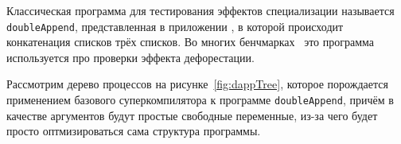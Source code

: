 

Классическая программа для тестирования эффектов специализации называется
\lstinline{doubleAppend}, представленная в приложении \todo{},
в которой происходит конкатенация списков трёх списков.
Во многих бенчмарках~\cite{cpdPract, controlPoly} это программа используется
про проверки эффекта дефорестации.

Рассмотрим дерево процессов на рисунке~\ref{fig:dappTree}, которое порождается применением базового
суперкомпилятора к программе \lstinline{doubleAppend}, причём в
качестве аргументов будут простые свободные переменные, из-за чего
будет просто оптмизироваться сама структура программы.

